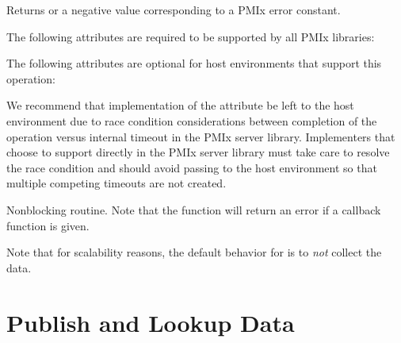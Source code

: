 \begin{arglist}
\end{arglist}

Returns  or a negative value corresponding to a PMIx error constant.

\reqattrstart
The following attributes are required to be supported by all \ac{PMIx} libraries:


\reqattrend

\optattrstart
The following attributes are optional for host environments that support this operation:


\optattrend

\adviceimplstart
We recommend that implementation of the  attribute be left to the host environment due to race condition considerations between completion of the operation versus internal timeout in the \ac{PMIx} server library. Implementers that choose to support  directly in the \ac{PMIx} server library must take care to resolve the race condition and should avoid passing  to the host environment so that multiple competing timeouts are not created.
\adviceimplend

\descr

Nonblocking  routine.
Note that the function will return an error if a  callback function is given.

Note that for scalability reasons, the default behavior for  is to \emph{not} collect the data.


\section{Publish and Lookup Data}
\label{chap:api_kv_mgmt:publish}

